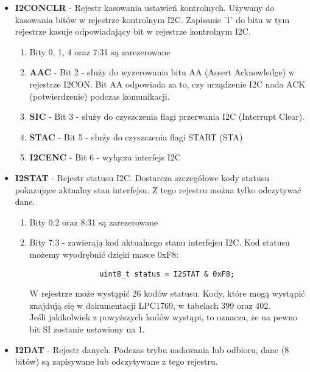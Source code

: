 \documentclass{article}
\begin{document}
\begin{itemize}
\begin{enumerate}
        
    \end{enumerate}
    \item \textbf{I2CONCLR} - Rejestr kasowania ustawień kontrolnych. Używany do kasowania bitów w rejestrze kontrolnym I2C. Zapisanie '1' do bitu w tym rejestrze kasuje odpowiadający bit w rejestrze kontrolnym I2C.
    \begin{enumerate}
        \item Bity 0, 1, 4 oraz 7:31 są zarezerowane
        \item \textbf{AAC} - Bit 2 - służy do wyzerowania bitu AA (Assert Acknowledge) w rejestrze I2CON. Bit AA odpowiada za to, czy urządzenie I2C nada ACK (potwierdzenie) podczas komunikacji.
        \item \textbf{SIC} - Bit 3 - służy do czyszczenia flagi przerwania I2C (Interrupt Clear). 
        \item \textbf{STAC} - Bit 5 - służy do czyszczenia flagi START (STA)
        \item \textbf{I2CENC} - Bit 6 - wyłącza interfejs I2C
    \end{enumerate}
    
    \item \textbf{I2STAT} - Rejestr statusu I2C. Dostarcza szczegółowe kody statusu pokazujące aktualny stan interfejsu. Z tego rejestru można tylko odczytywać dane.
    \begin{enumerate}
        \item Bity 0:2 oraz 8:31 są zarezerowane
        \item Bity 7:3 - zawierają kod aktualnego stanu interfejsu I2C.
            Kod statusu możemy wyodrębnić dzięki masce 0xF8:\\
            \begin{verbatim}
                uint8_t status = I2STAT & 0xF8;
            \end{verbatim}

            W rejestrze może wystąpić 26 kodów statusu. Kody, które mogą wystąpić znajdują się w dokumentacji LPC1769, w tabelach 399 oraz 402.\\
            Jeśli jakikolwiek z powyższych kodów wystąpi, to oznacza, że na pewno bit SI zostanie ustawiony na 1.
    \end{enumerate}
    
    
    \item \textbf{I2DAT} - Rejestr danych. Podczas trybu nadawania lub odbioru, dane (8 bitów) są zapisywane lub odczytywane z tego rejestru.   
    

\end{itemize}
\end{document}
